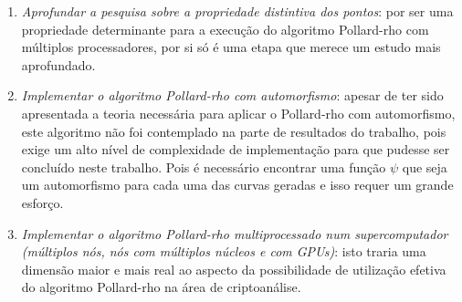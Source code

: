 \begin{enumerate}
	\item \textit{Aprofundar a pesquisa sobre a propriedade distintiva dos pontos}: por ser uma propriedade determinante para a execução do algoritmo Pollard-rho com múltiplos processadores, por si só é uma etapa que merece um estudo mais aprofundado.
	\item \textit{Implementar o algoritmo Pollard-rho com automorfismo}: apesar de ter sido apresentada a teoria necessária para aplicar o Pollard-rho com automorfismo, este algoritmo não foi contemplado na parte de resultados do trabalho, pois exige um alto nível de complexidade de implementação para que pudesse ser concluído neste trabalho. Pois é necessário encontrar uma função \(\psi\) que seja um automorfismo para cada uma das curvas geradas e isso requer um grande esforço.
	\item \textit{Implementar o algoritmo Pollard-rho multiprocessado num supercomputador (múltiplos nós, nós com múltiplos núcleos e com GPUs)}: isto traria uma  dimensão maior e mais real ao aspecto da possibilidade de utilização efetiva do algoritmo Pollard-rho na área de criptoanálise.
\end{enumerate}
